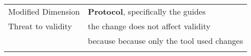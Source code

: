 \begin{table*}[h]
\begin{tabularx}{\textwidth}{
  >{\hsize=0.25\hsize}X
  >{\hsize=0.8\hsize}X}
    Modified Dimension & 
    \textbf{Protocol}, specifically the guides \\   
    Threat to validity  & the change does not affect validity \\
    & because because only the tool used changes
 \\ 
	
   	\noalign{\smallskip\smallskip}\hline
	\end{tabularx}  
\end{table*}
